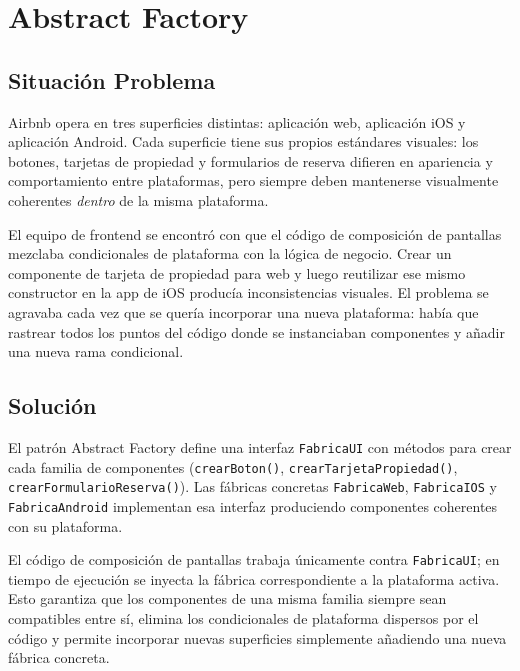 
\chapter{Abstract Factory}

\section{Situación Problema}

Airbnb opera en tres superficies distintas: aplicación web, aplicación
iOS y aplicación Android. Cada superficie tiene sus propios estándares
visuales: los botones, tarjetas de propiedad y formularios de reserva
difieren en apariencia y comportamiento entre plataformas, pero siempre
deben mantenerse visualmente coherentes \emph{dentro} de la misma
plataforma.

El equipo de frontend se encontró con que el código de composición de
pantallas mezclaba condicionales de plataforma con la lógica de negocio.
Crear un componente de tarjeta de propiedad para web y luego reutilizar
ese mismo constructor en la app de iOS producía inconsistencias visuales.
El problema se agravaba cada vez que se quería incorporar una nueva
plataforma: había que rastrear todos los puntos del código donde se
instanciaban componentes y añadir una nueva rama condicional.


\section{Solución}

El patrón Abstract Factory define una interfaz \texttt{FabricaUI} con
métodos para crear cada familia de componentes (\texttt{crearBoton()},
\texttt{crearTarjetaPropiedad()}, \texttt{crearFormularioReserva()}).
Las fábricas concretas \texttt{FabricaWeb}, \texttt{FabricaIOS} y
\texttt{FabricaAndroid} implementan esa interfaz produciendo componentes
coherentes con su plataforma.

El código de composición de pantallas trabaja únicamente contra
\texttt{FabricaUI}; en tiempo de ejecución se inyecta la fábrica
correspondiente a la plataforma activa. Esto garantiza que los componentes
de una misma familia siempre sean compatibles entre sí, elimina los
condicionales de plataforma dispersos por el código y permite incorporar
nuevas superficies simplemente añadiendo una nueva fábrica concreta.

